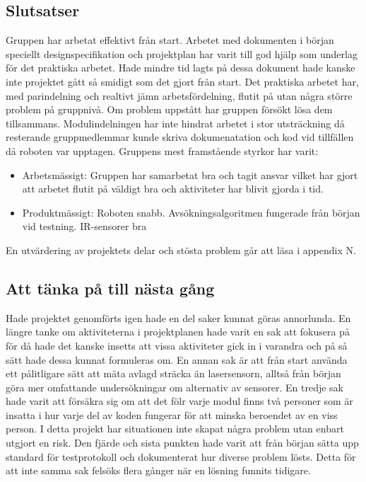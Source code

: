 \documentclass[11pt]{article}
\begin{document}
\begin{flushleft}
\subsection{Slutsatser}

Gruppen har arbetat effektivt från start. Arbetet med dokumenten i början speciellt designspecifikation och projektplan har varit till god hjälp som underlag för det praktiska arbetet. Hade mindre tid lagts på dessa dokument hade kanske inte projektet gått så smidigt som det gjort från start. Det praktiska arbetet har, med parindelning och realtivt jämn arbetsfördelning, flutit på utan några större problem på gruppnivå. Om problem uppstått har gruppen försökt lösa dem tillsammans. Modulindelningen har inte hindrat arbetet i stor utsträckning då resterande gruppmedlemmar kunde skriva dokumenatation och kod vid tillfällen då roboten var upptagen. Gruppens mest framstående styrkor har varit: 
\begin{itemize}
\item Arbetsmässigt: Gruppen har samarbetat bra och tagit ansvar vilket har gjort att arbetet flutit på väldigt bra och aktiviteter har blivit gjorda i tid. 
\item Produktmässigt: Roboten snabb. Avsökningsalgoritmen fungerade från början vid testning. IR-sensorer bra
\end{itemize}

En utvärdering av projektets delar och stösta problem går att läsa i appendix N.

\subsection{Att tänka på till nästa gång}

Hade projektet genomförts igen hade en del saker kunnat göras annorlunda. En längre tanke om aktiviteterna i projektplanen hade varit en sak att fokusera på för då hade det kanske insetts att vissa aktiviteter gick in i varandra och på så sätt hade dessa kunnat formuleras om. En annan sak är att från start använda ett pålitligare sätt att mäta avlagd sträcka än lasersensorn, alltså från början göra mer omfattande undersökningar om alternativ av sensorer. En tredje sak hade varit att försäkra sig om att det fölr varje modul finns två personer som är insatta i hur varje del av koden fungerar för att minska beroendet av en viss person. I detta projekt har situationen inte skapat några problem utan enbart utgjort en risk. Den fjärde och sista punkten hade varit att från början sätta upp standard för testprotokoll och dokumenterat hur diverse problem lösts. Detta för att inte samma sak felsöks flera gånger när en lösning funnits tidigare. 


\end{flushleft}
\end{document}
